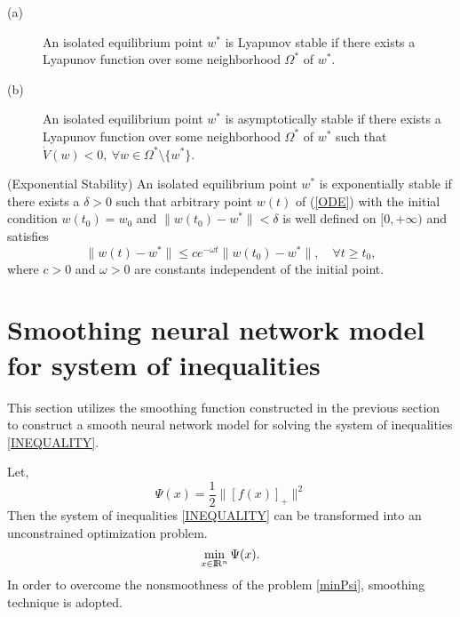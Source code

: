 \documentclass[12pt]{article}
\renewcommand{\Re}{{\rm I}\! {\rm R}}
\newcommand{\rn}{\Re^n}
\begin{document}
 \medskip

 \begin{lemma} \label{stablecondition}
 \begin{description}
 \item[(a)] An isolated equilibrium point $w^*$ is Lyapunov stable
            if there exists a Lyapunov function over some
            neighborhood $\Omega^*$ of $w^*$.
 \item[(b)] An isolated equilibrium point $w^*$ is asymptotically stable
            if there exists a Lyapunov function over some
            neighborhood $\Omega^*$ of $w^*$ such that $\dot{V}(w)<0,\
            \forall w\in\Omega^*\setminus \{w^*\}$.
 \end{description}
 \end{lemma}

 \medskip

 \begin{definition} (Exponential Stability)
 An isolated equilibrium point $w^*$ is exponentially stable if there
 exists a $\delta>0$ such that arbitrary point $w(t)$ of (\ref{ODE})
 with the initial condition $w(t_0)=w_0$ and $\|w(t_0)-w^*\|<\delta$
 is well defined on $[0,+\infty)$ and satisfies
 \[
 \|w(t)-w^*\|\leq ce^{-\omega t}\|w(t_0)-w^*\|,\quad \forall t\geq
 t_0,
 \]
 where $c>0$ and $\omega>0$ are constants independent of the initial
 point.
 \end{definition}

 \medskip

 \section{Smoothing neural network model for system of inequalities}

This section utilizes the smoothing function constructed in the 
previous section to construct a smooth neural network model for 
solving the  system of inequalities \eqref{INEQUALITY}.

Let,
\begin{equation}\label{Psi}
\Psi(x) = \frac{1}{2}\| [ f(x) ]_+ \|^2
\end{equation}
Then the system of inequalities \eqref{INEQUALITY}
can be transformed into an  unconstrained optimization
problem.
\begin{equation}\label{minPsi}
\min_{x\in \rn} \Psi(x).
\end{equation}
In order to overcome the nonsmoothness of the problem \eqref{minPsi},
smoothing technique is adopted.
\end{document}
